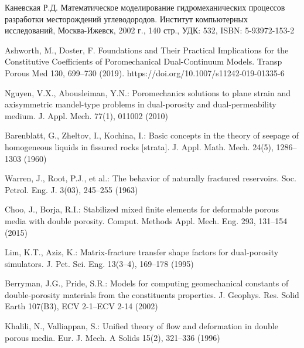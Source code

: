 \documentclass[14pt]{article}
\begin{document}

\begin{thebibliography}{10}

	 Каневская Р.Д. Математическое моделирование гидромеханических процессов разработки месторождений углеводородов. Институт компьютерных исследований, Москва-Ижевск, 2002 г., 140 стр., УДК: 532, ISBN: 5-93972-153-2

	 Ashworth, M., Doster, F. Foundations and Their Practical Implications for the Constitutive Coefficients of Poromechanical Dual-Continuum Models. Transp Porous Med 130, 699–730 (2019). https://doi.org/10.1007/s11242-019-01335-6	
	
	 Nguyen, V.X., Abousleiman, Y.N.: Poromechanics solutions to plane strain and axisymmetric mandel-type problems in dual-porosity and dual-permeability medium. J. Appl. Mech. 77(1), 011002 (2010)

	 Barenblatt, G., Zheltov, I., Kochina, I.: Basic concepts in the theory of seepage of homogeneous liquids in
fissured rocks [strata]. J. Appl. Math. Mech. 24(5), 1286–1303 (1960)	
	
	 Warren, J., Root, P.J., et al.: The behavior of naturally fractured reservoirs. Soc. Petrol. Eng. J. 3(03), 245–255 (1963)
		
	 Choo, J., Borja, R.I.: Stabilized mixed finite elements for deformable porous media with double porosity.
Comput. Methods Appl. Mech. Eng. 293, 131–154 (2015)

	 Lim, K.T., Aziz, K.: Matrix-fracture transfer shape factors for dual-porosity simulators. J. Pet. Sci. Eng. 13(3–4), 169–178 (1995)
		
	 Berryman, J.G., Pride, S.R.: Models for computing geomechanical constants of double-porosity materials from the constituents properties. J. Geophys. Res. Solid Earth 107(B3), ECV 2-1–ECV 2-14 (2002)
	
	 Khalili, N., Valliappan, S.: Unified theory of flow and deformation in double porous media. Eur. J. Mech. A Solids 15(2), 321–336 (1996)
	
\end{thebibliography}
\end{document}
